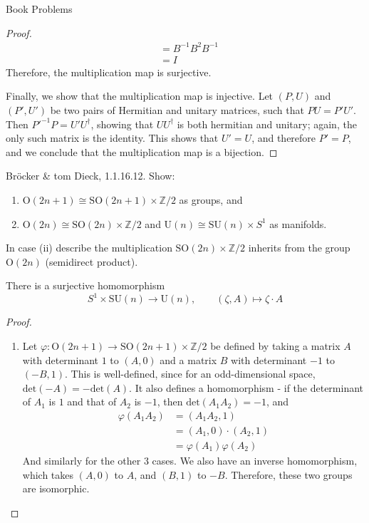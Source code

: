 \documentclass[12pt]{article}
\newcommand{\Z}{\mathbb{Z}}
\theoremstyle{definition}
\newenvironment{problem}[2][Problem]{\begin{trivlist}
\item[\hskip \labelsep {\bfseries #1}\hskip \labelsep {\bfseries #2.}]}{\end{trivlist}}
\begin{document}
\begin{section}{Book Problems}
\begin{proof}
\begin{align*}
		&= B^{-1}B^2 B^{-1}\\
		&= I
	\end{align*}
	Therefore, the multiplication map is surjective.
	\par Finally, we show that the multiplication map is injective. Let $(P, U)$ and $(P', U')$ be two pairs of Hermitian and unitary matrices, such that $PU = P'U'$. Then $P'^{-1}P = U'U^{\dagger}$, showing that $UU^{\dagger}$ is both hermitian and unitary; again, the only such matrix is the identity. This shows that $U' = U$, and therefore $P' = P$, and we conclude that the multiplication map is a bijection.
\end{proof}
\begin{problem}{4}
	Br\"ocker \& tom Dieck, 1.1.16.12.  Show:
	\begin{enumerate}[label=(\roman*)]
		\item $\text{O}(2n + 1) \cong \text{SO}(2n + 1) \times \Z/2$ as groups, and
		\item $\text{O}(2n) \cong \text{SO}(2n) \times \Z/2$ and $\text{U}(n) \cong \text{SU}(n) \times S^1$ as manifolds. 
	\end{enumerate}
	In case (ii) describe the multiplication $\text{SO}(2n) \times \Z/2$ inherits from the group $\text{O}(2n)$ (semidirect product).
	\par There is a surjective homomorphism 
	\[ S^1 \times \text{SU}(n) \to \text{U}(n), \qquad (\zeta, A) \mapsto \zeta \cdot A\]
\end{problem}
\begin{proof}
	\begin{enumerate}[label=(\roman*)]
		\item  Let $\varphi: \text{O}(2n + 1) \to \text{SO}(2n + 1) \times \Z/2$ be defined by taking a matrix $A$ with determinant $1$ to $(A, 0)$ and a matrix $B$ with determinant $-1$ to $(-B, 1)$. This is well-defined, since for an odd-dimensional space, $\text{det}(-A) = -\text{det}(A)$. It also defines a homomorphism - if the determinant of $A_1$ is $1$ and that of $A_2$ is $-1$, then $\text{det}(A_1A_2) = -1$, and 
			\begin{align*}
				 \varphi(A_1A_2) &= (A_1A_2, 1) \\
				 &= (A_1, 0) \cdot (A_2, 1)\\
				 &= \varphi(A_1)\varphi(A_2)
			\end{align*}	
			And similarly for the other 3 cases. We also have an inverse homomorphism, which takes $(A, 0)$ to $A$, and $(B, 1)$ to $-B$. Therefore, these two groups are isomorphic.

\end{enumerate}
\end{proof}
\end{section}
\end{document}
